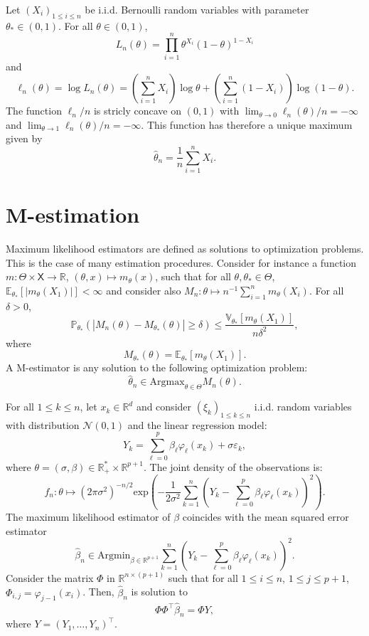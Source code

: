 \documentclass[english,graybox,envcountchap,envcountsame,sectrefs,shortlabels]{svmono}
\theoremstyle{style}
\newcommand{\eqsp}{}
\newcommand{\Xset}{\mathsf{X}}
\begin{document}
\begin{example}
Let $(X_i)_{1\leq i\leq n}$ be i.i.d. Bernoulli random variables with parameter $\theta_*\in(0,1)$. For all $\theta\in(0,1)$,
$$
L_n(\theta) = \prod_{i=1}^n \theta^{X_i}(1-\theta)^{1-X_i}
$$
and
$$
\ell_n(\theta) = \log L_n(\theta) = \left(\sum_{i=1}^nX_i\right)\log\theta + \left(\sum_{i=1}^n(1-X_i)\right)\log(1-\theta)\eqsp.
$$
The function $\ell_n/n$ is stricly concave on $(0,1)$ with $\lim_{\theta\to 0}\ell_n(\theta)/n  =-\infty$ and $\lim_{\theta\to 1}\ell_n(\theta)/n =-\infty$. This function has therefore a unique maximum given by
$$
\widehat\theta_n = \frac{1}{n}\sum_{i=1}^nX_i\eqsp.
$$
\end{example}

\section{M-estimation}
Maximum likelihood estimators are defined as solutions to optimization problems. This is the case of many estimation procedures. Consider for instance a function $m:\Theta\times \Xset \to \mathbb{R}$, $(\theta,x)\mapsto m_\theta(x)$, such that for all $\theta,\theta_*\in\Theta$, $\mathbb{E}_{\theta_*}[|m_\theta(X_1)|]<\infty$ and consider also $M_n:\theta\mapsto n^{-1}\sum_{i=1}^n m_\theta(X_i)$. For all $\delta>0$,
$$
\mathbb{P}_{\theta_*}\left(\left|M_n(\theta) - M_{\theta_*}(\theta)\right|\geq \delta\right)\leq \frac{\mathbb{V}_{\theta_*}[m_\theta(X_1)]}{n\delta^2}\eqsp,
$$
where
$$
M_{\theta_*}(\theta) = \mathbb{E}_{\theta_*}[m_\theta(X_1)]\eqsp.
$$
A M-estimator is any solution to the following optimization problem:
$$
\widehat\theta_n\in \mathrm{Argmax}_{\theta\in\Theta} M_n(\theta)\eqsp.
$$

\begin{example}
For all $1\leq k\leq n$, let $x_k\in\mathbb{R}^d$ and consider $(\xi_k)_{1\leq k\leq n}$  i.i.d. random variables with distribution $\mathcal{N}(0,1)$ and the linear regression model:
$$
Y_k = \sum_{\ell=0}^{p}\beta_\ell \varphi_\ell(x_k) + \sigma\varepsilon_k\eqsp,
$$
where $\theta = (\sigma,\beta)\in\mathbb{R}_+^*\times \mathbb{R}^{p+1}$. The joint density of the observations is:
$$
f_n:\theta\mapsto (2\pi\sigma^2)^{-n/2}\mathrm{exp}\left(-\frac{1}{2\sigma^2}\sum_{k=1}^n\left(Y_k-\sum_{\ell=0}^{p}\beta_\ell \varphi_\ell(x_k)\right)^2\right)\eqsp.
$$
The maximum likelihood estimator of $\beta$ coincides with the mean squared error estimator
$$
\widehat{\beta}_n \in\mathrm{Argmin}_{\beta\in \mathbb{R}^{p+1}} \sum_{k=1}^n\left(Y_k-\sum_{\ell=0}^{p}\beta_\ell \varphi_\ell(x_k)\right)^2\eqsp.
$$
Consider the matrix $\Phi$ in $\mathbb{R}^{n\times(p+1)}$ such that for all $1\leq i \leq n$, $1\leq j \leq p+1$, $\Phi_{i,j} = \varphi_{j-1}(x_i)$. Then, $\widehat{\beta}_n$ is solution to 
$$
\Phi\Phi^\top \widehat{\beta}_n = \Phi Y\eqsp,
$$
where $Y = (Y_1,\ldots,Y_n)^\top$.
\end{example}
\end{document}
